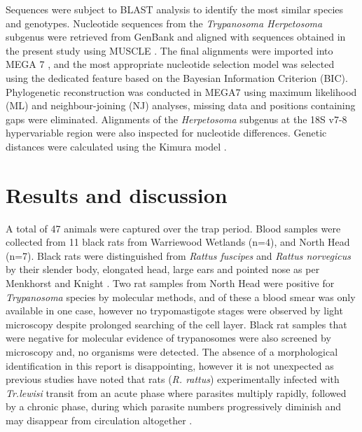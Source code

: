\documentclass[a4paper, nobind]{templates/ociamthesis}
\begin{document}
Sequences were subject to BLAST analysis to identify the most similar species and genotypes. Nucleotide sequences from the \emph{Trypanosoma Herpetosoma} subgenus were retrieved from GenBank \autocite{bensonGenBank2017} and aligned with sequences obtained in the present study using MUSCLE \autocite{edgarMUSCLEMultipleSequence2004}. The final alignments were imported into MEGA 7 \autocite{kumarMEGA7MolecularEvolutionary2016}, and the most appropriate nucleotide selection model was selected using the dedicated feature based on the Bayesian Information Criterion (BIC). Phylogenetic reconstruction was conducted in MEGA7 using maximum likelihood (ML) and neighbour-joining (NJ) analyses, missing data and positions containing gaps were eliminated. Alignments of the \emph{Herpetosoma} subgenus at the 18S v7-8 hypervariable region were also inspected for nucleotide differences. Genetic distances were calculated using the Kimura model \autocite{edgarMUSCLEMultipleSequence2004}.

\hypertarget{results-and-discussion-1}{%
\section{Results and discussion}\label{results-and-discussion-1}}

A total of 47 animals were captured over the trap period. Blood samples were collected from 11 black rats from Warriewood Wetlands (n=4), and North Head (n=7). Black rats were distinguished from \emph{Rattus fuscipes} and \emph{Rattus norvegicus} by their slender body, elongated head, large ears and pointed nose as per Menkhorst and Knight \autocite*{menkhorstFieldGuideMammals2011}. Two rat samples from North Head were positive for \emph{Trypanosoma} species by molecular methods, and of these a blood smear was only available in one case, however no trypomastigote stages were observed by light microscopy despite prolonged searching of the cell layer. Black rat samples that were negative for molecular evidence of trypanosomes were also screened by microscopy and, no organisms were detected. The absence of a morphological identification in this report is disappointing, however it is not unexpected as previous studies have noted that rats (\emph{R. rattus}) experimentally infected with \emph{Tr.lewisi} transit from an acute phase where parasites multiply rapidly, followed by a chronic phase, during which parasite numbers progressively diminish and may disappear from circulation altogether \autocite{mackerrasHaematozoaAustralianMammals1959}.
\end{document}
